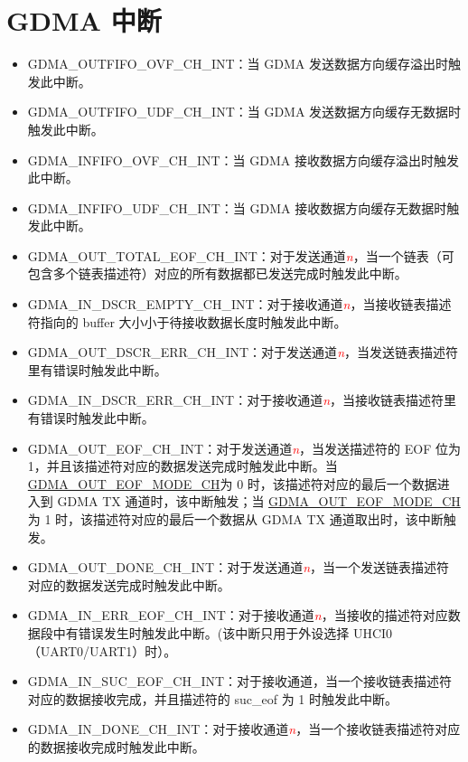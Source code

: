 \documentclass[main\_\_CN.tex]{subfiles}
\begin{document}
\section{GDMA 中断}
\begin{itemize}
\item \label{int:GDMAOUTFIFOOVFINT} GDMA\_OUTFIFO\_OVF\_CH\_INT：当 GDMA 发送数据方向缓存溢出时触发此中断。
\item \label{int:GDMAOUTFIFOUDFINT}GDMA\_OUTFIFO\_UDF\_CH\_INT：当 GDMA 发送数据方向缓存无数据时触发此中断。
\item \label{int:GDMAINFIFOOVFINT} GDMA\_INFIFO\_OVF\_CH\_INT：当 GDMA 接收数据方向缓存溢出时触发此中断。
\item \label{int:GDMAINFIFOUDFINT}GDMA\_INFIFO\_UDF\_CH\_INT：当 GDMA 接收数据方向缓存无数据时触发此中断。
\item \label{int:GDMAOUTTOTALEOFINT}GDMA\_OUT\_TOTAL\_EOF\_CH\_INT：对于发送通道\textcolor{red}{\it{n}}，当一个链表（可包含多个链表描述符）对应的所有数据都已发送完成时触发此中断。
\item \label{int:GDMAINDSCREMPTYINT}GDMA\_IN\_DSCR\_EMPTY\_CH\_INT：对于接收通道\textcolor{red}{\it{n}}，当接收链表描述符指向的 buffer 大小小于待接收数据长度时触发此中断。
\item \label{int:GDMAOUTDSCRERRINT}GDMA\_OUT\_DSCR\_ERR\_CH\_INT：对于发送通道\textcolor{red}{\it{n}}，当发送链表描述符里有错误时触发此中断。
\item \label{int:GDMAINDSCRERRINT}GDMA\_IN\_DSCR\_ERR\_CH\_INT：对于接收通道\textcolor{red}{\it{n}}，当接收链表描述符里有错误时触发此中断。
\item \label{int:GDMAOUTEOFINT}GDMA\_OUT\_EOF\_CH\_INT：对于发送通道\textcolor{red}{\it{n}}，当发送描述符的 EOF 位为 1，并且该描述符对应的数据发送完成时触发此中断。当 \hyperref[fielddesc:GDMAOUTEOFMODECHN]{GDMA\_OUT\_EOF\_MODE\_CH}为 0 时，该描述符对应的最后一个数据进入到 GDMA TX 通道时，该中断触发；当 \hyperref[fielddesc:GDMAOUTEOFMODECHN]{GDMA\_OUT\_EOF\_MODE\_CH}为 1 时，该描述符对应的最后一个数据从 GDMA TX 通道取出时，该中断触发。
\item \label{int:GDMAOUTDONEINT}GDMA\_OUT\_DONE\_CH\_INT：对于发送通道\textcolor{red}{\it{n}}，当一个发送链表描述符对应的数据发送完成时触发此中断。
\item \label{int:GDMAINERREOFINT}GDMA\_IN\_ERR\_EOF\_CH\_INT：对于接收通道\textcolor{red}{\it{n}}，当接收的描述符对应数据段中有错误发生时触发此中断。(该中断只用于外设选择 UHCI0（UART0/UART1）时）。
\item \label{int:GDMAINSUCEOFINT}GDMA\_IN\_SUC\_EOF\_CH\_INT：对于接收通道，当一个接收链表描述符对应的数据接收完成，并且描述符的 suc\_eof 为 1 时触发此中断。
\item \label{int:GDMAINDONEINT}GDMA\_IN\_DONE\_CH\_INT：对于接收通道\textcolor{red}{\it{n}}，当一个接收链表描述符对应的数据接收完成时触发此中断。
\end{itemize}
\end{document}
